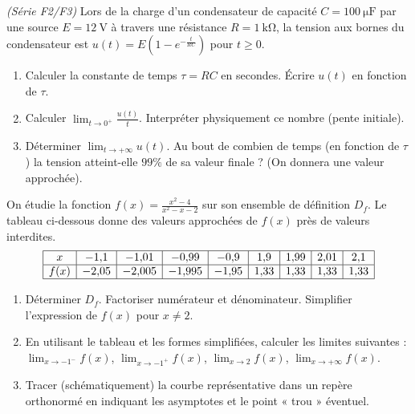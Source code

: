 \documentclass[11pt]{article}
\begin{document}
\begin{exercice}
\emph{(Série F2/F3)} Lors de la charge d'un condensateur de capacité $C = \SI{100}{\micro\farad}$ par une source $E = \SI{12}{\volt}$ à travers une résistance $R = \SI{1}{\kilo\ohm}$, la tension aux bornes du condensateur est $u(t) = E\left(1 - e^{-\frac{t}{RC}}\right)$ pour $t \geq 0$.
\begin{enumerate}
    \item Calculer la constante de temps $\tau = RC$ en secondes. Écrire $u(t)$ en fonction de $\tau$.
    \item Calculer $\lim_{t \to 0^+} \frac{u(t)}{t}$. Interpréter physiquement ce nombre (pente initiale).
    \item Déterminer $\lim_{t \to +\infty} u(t)$. Au bout de combien de temps (en fonction de $\tau$) la tension atteint-elle $99\%$ de sa valeur finale ? (On donnera une valeur approchée).
\end{enumerate}
\end{exercice}

\begin{exercice}
On étudie la fonction $f(x) = \frac{x^2 - 4}{x^2 - x - 2}$ sur son ensemble de définition $D_f$. Le tableau ci-dessous donne des valeurs approchées de $f(x)$ près de valeurs interdites.
\[
\begin{array}{|*9{c|}}
\hline
x & -1{,}1 & -1{,}01 & -0{,}99 & -0{,}9 & 1{,}9 & 1{,}99 & 2{,}01 & 2{,}1 \\
\hline
f(x) & -2{,}05 & -2{,}005 & -1{,}995 & -1{,}95 & 1{,}33 & 1{,}33 & 1{,}33 & 1{,}33 \\
\hline
\end{array}
\]
\begin{enumerate}
    \item Déterminer $D_f$. Factoriser numérateur et dénominateur. Simplifier l'expression de $f(x)$ pour $x \neq 2$.
    \item En utilisant le tableau et les formes simplifiées, calculer les limites suivantes :
    $\lim_{x \to -1^-} f(x)$, $\lim_{x \to -1^+} f(x)$, $\lim_{x \to 2} f(x)$, $\lim_{x \to +\infty} f(x)$.
    \item Tracer (schématiquement) la courbe représentative dans un repère orthonormé en indiquant les asymptotes et le point « trou » éventuel.
\end{enumerate}
\end{exercice}
\end{document}
